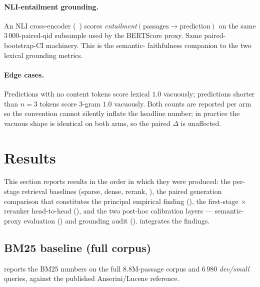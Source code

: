 \documentclass[11pt,a4paper]{article}
\newcommand{\devsmall}{\textit{dev/small}}
\newcommand{\fdev}{6\,980}
\newcommand{\bertscore}{BERTScore}
\newcommand{\bmtwofive}{BM25}
\begin{document}
\paragraph{NLI-entailment grounding.}  An NLI cross-encoder
(\texttt{}~\cite{he2023debertav3,williams2018mnli})
scores \emph{entailment}$(\text{passages} \to \text{prediction})$ on
the same 3\,000-paired-qid subsample used by the \bertscore{}
proxy.  Same paired-bootstrap-CI machinery.  This is the semantic-
faithfulness companion to the two lexical grounding metrics.

\paragraph{Edge cases.}  Predictions with no content tokens score
lexical $1.0$ vacuously; predictions shorter than $n\!=\!3$ tokens
score 3-gram $1.0$ vacuously.  Both counts are reported per arm so
the convention cannot silently inflate the headline number; in
practice the vacuous shape is identical on both arms, so the paired
$\Delta$ is unaffected.

\clearpage\section{Results}
\label{sec:results}

This section reports results in the order in which they were
produced: the per-stage retrieval baselines (sparse, dense, rerank,
), the
paired generation comparison that constitutes the principal
empirical finding (), the first-stage
$\times$ reranker head-to-head (), and the
two post-hoc calibration layers --- semantic-proxy evaluation
() and grounding audit ().
 integrates the findings.

\subsection{\bmtwofive{} baseline (full corpus)}
\label{sec:w2-results}

 reports the \bmtwofive{} numbers on the full
8.8M-passage corpus and \fdev{} \devsmall{} queries, against the
published Anserini/Lucene reference.
\end{document}
